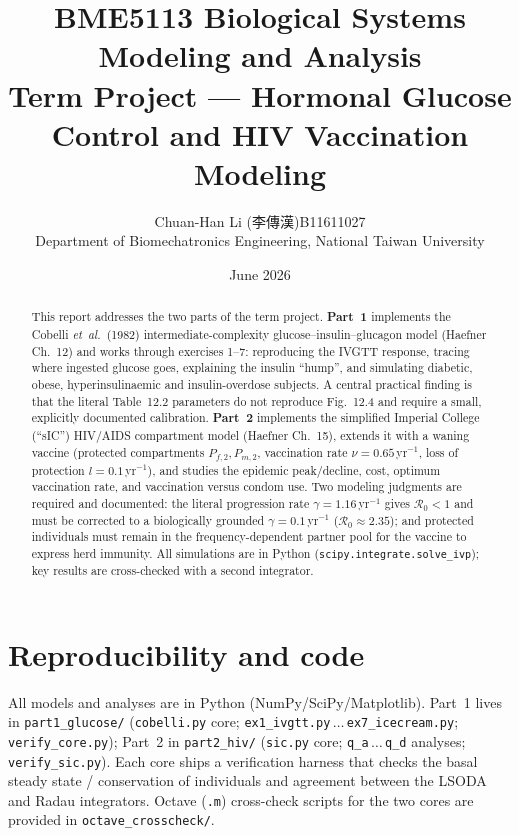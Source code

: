 \documentclass[11pt]{article}
\title{\vspace{-1.2cm}\textbf{BME5113 Biological Systems Modeling and Analysis}\\[4pt]
\large Term Project --- Hormonal Glucose Control and HIV Vaccination Modeling}
\author{Chuan-Han Li (李傳漢)\quad B11611027\\ \small Department of Biomechatronics Engineering, National Taiwan University}
\date{June 2026}
\newcommand{\Rzero}{\mathcal{R}_0}
\begin{document}
\maketitle
\thispagestyle{empty}

\begin{abstract}
\noindent This report addresses the two parts of the term project. \textbf{Part~1} implements the
Cobelli \emph{et~al.}\ (1982) intermediate-complexity glucose--insulin--glucagon model (Haefner
Ch.~12) and works through exercises 1--7: reproducing the IVGTT response, tracing where ingested
glucose goes, explaining the insulin ``hump'', and simulating diabetic, obese, hyperinsulinaemic and
insulin-overdose subjects. A central practical finding is that the literal Table~12.2 parameters do
not reproduce Fig.~12.4 and require a small, explicitly documented calibration. \textbf{Part~2}
implements the simplified Imperial College (``sIC'') HIV/AIDS compartment model (Haefner Ch.~15),
extends it with a waning vaccine (protected compartments $P_{f,2},P_{m,2}$, vaccination rate
$\nu=0.65\,$yr$^{-1}$, loss of protection $l=0.1\,$yr$^{-1}$), and studies the epidemic peak/decline,
cost, optimum vaccination rate, and vaccination versus condom use. Two modeling judgments are
required and documented: the literal progression rate $\gamma=1.16\,$yr$^{-1}$ gives $\Rzero<1$ and
must be corrected to a biologically grounded $\gamma=0.1\,$yr$^{-1}$ ($\Rzero\approx2.35$); and
protected individuals must remain in the frequency-dependent partner pool for the vaccine to express
herd immunity. All simulations are in Python (\texttt{scipy.integrate.solve\_ivp}); key results are
cross-checked with a second integrator.
\end{abstract}

\tableofcontents
\vspace{0.6em}


\clearpage

\clearpage

\section{Reproducibility and code}
All models and analyses are in Python (NumPy/SciPy/Matplotlib). Part~1 lives in
\texttt{part1\_glucose/} (\texttt{cobelli.py} core; \texttt{ex1\_ivgtt.py}\,$\dots$\,\texttt{ex7\_icecream.py};
\texttt{verify\_core.py}); Part~2 in \texttt{part2\_hiv/} (\texttt{sic.py} core; \texttt{q\_a}\,$\dots$\,\texttt{q\_d}
analyses; \texttt{verify\_sic.py}). Each core ships a verification harness that checks the basal
steady state / conservation of individuals and agreement between the LSODA and Radau integrators.
Octave (\texttt{.m}) cross-check scripts for the two cores are provided in \texttt{octave\_crosscheck/}.
\end{document}

